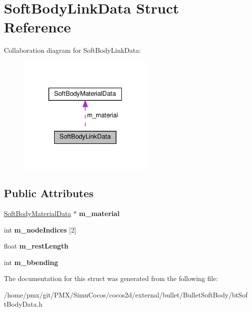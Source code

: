 \hypertarget{structSoftBodyLinkData}{}\section{Soft\+Body\+Link\+Data Struct Reference}
\label{structSoftBodyLinkData}


Collaboration diagram for Soft\+Body\+Link\+Data\+:
\nopagebreak
\begin{figure}[H]
\begin{center}
\leavevmode
\includegraphics[width=193pt]{structSoftBodyLinkData__coll__graph}
\end{center}
\end{figure}
\subsection*{Public Attributes}
\begin{DoxyCompactItemize}
\item 
\mbox{\label{structSoftBodyLinkData_a4d930951b51d81f0ecd1c91b69370292}} 
\hyperlink{structSoftBodyMaterialData}{Soft\+Body\+Material\+Data} $\ast$ {\bfseries m\+\_\+material}
\item 
\mbox{\label{structSoftBodyLinkData_a2d6e0b5cf017da8c450099f775f965a3}} 
int {\bfseries m\+\_\+node\+Indices} \mbox{[}2\mbox{]}
\item 
\mbox{\label{structSoftBodyLinkData_ae5fb5d5d3cfdf9b427360ad0211344df}} 
float {\bfseries m\+\_\+rest\+Length}
\item 
\mbox{\label{structSoftBodyLinkData_a9203bb205397199fa65fd760d178a74d}} 
int {\bfseries m\+\_\+bbending}
\end{DoxyCompactItemize}


The documentation for this struct was generated from the following file\+:\begin{DoxyCompactItemize}
\item 
/home/pmx/git/\+P\+M\+X/\+Simu\+Cocos/cocos2d/external/bullet/\+Bullet\+Soft\+Body/bt\+Soft\+Body\+Data.\+h\end{DoxyCompactItemize}
